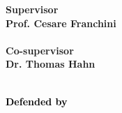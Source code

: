 \begin{titlepage}
    \vspace{50mm} \par \noindent
    
    \begin{minipage}[t]{0.47\textwidth}
        {\large{\bf Supervisor \vspace{2mm}\\
        Prof. Cesare Franchini\\\\
        \bf Co-supervisor %
        \vspace{2mm}\\
        Dr. Thomas Hahn\\\\}}
    \end{minipage}
    \hfill
    \begin{minipage}[L]{0.35\textwidth} \textcolor{black}{
        {\large{\bf  Defended by
        \vspace{2mm}\\
        }}
        }
    \end{minipage}
    
\end{titlepage}